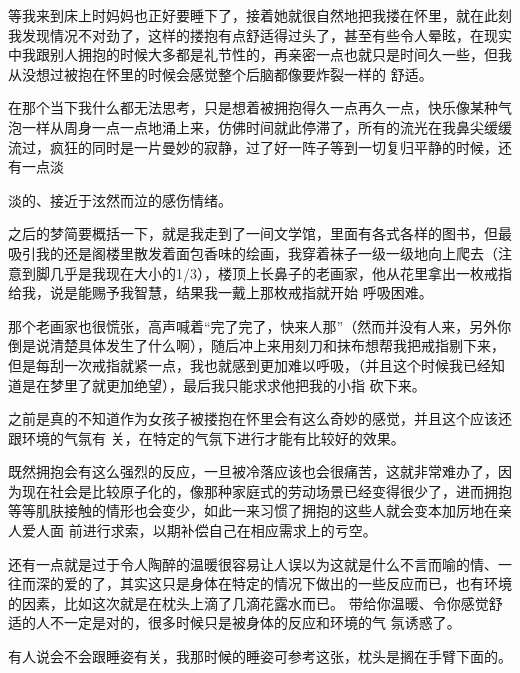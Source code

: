 \documentclass{article}
\begin{document}
等我来到床上时妈妈也正好要睡下了，接着她就很自然地把我搂在怀里，就在此刻我发现情况不对劲了，这样的搂抱有点舒适得过头了，甚至有些令人晕眩，在现实中我跟别人拥抱的时候大多都是礼节性的，再亲密一点也就只是时间久一些，但我从没想过被抱在怀里的时候会感觉整个后脑都像要炸裂一样的
舒适。 

在那个当下我什么都无法思考，只是想着被拥抱得久一点再久一点，快乐像某种气泡一样从周身一点一点地涌上来，仿佛时间就此停滞了，所有的流光在我鼻尖缓缓流过，疯狂的同时是一片曼妙的寂静，过了好一阵子等到一切复归平静的时候，还有一点淡

\newpage
淡的、接近于泫然而泣的感伤情绪。 

之后的梦简要概括一下，就是我走到了一间文学馆，里面有各式各样的图书，但最吸引我的还是阁楼里散发着面包香味的绘画，我穿着袜子一级一级地向上爬去（注意到脚几乎是我现在大小的1/3），楼顶上长鼻子的老画家，他从花里拿出一枚戒指给我，说是能赐予我智慧，结果我一戴上那枚戒指就开始
呼吸困难。 

那个老画家也很慌张，高声喊着“完了完了，快来人那”（然而并没有人来，另外你倒是说清楚具体发生了什么啊），随后冲上来用刻刀和抹布想帮我把戒指剔下来，但是每刮一次戒指就紧一点，我也就感到更加难以呼吸，（并且这个时候我已经知道是在梦里了就更加绝望），最后我只能求求他把我的小指
砍下来。 

之前是真的不知道作为女孩子被搂抱在怀里会有这么奇妙的感觉，并且这个应该还跟环境的气氛有
关，在特定的气氛下进行才能有比较好的效果。 

\newpage

既然拥抱会有这么强烈的反应，一旦被冷落应该也会很痛苦，这就非常难办了，因为现在社会是比较原子化的，像那种家庭式的劳动场景已经变得很少了，进而拥抱等等肌肤接触的情形也会变少，如此一来习惯了拥抱的这些人就会变本加厉地在亲人爱人面
前进行求索，以期补偿自己在相应需求上的亏空。 

还有一点就是过于令人陶醉的温暖很容易让人误以为这就是什么不言而喻的情、一往而深的爱的了，其实这只是身体在特定的情况下做出的一些反应而已，也有环境的因素，比如这次就是在枕头上滴了几滴花露水而已。 带给你温暖、令你感觉舒适的人不一定是对的，很多时候只是被身体的反应和环境的气
氛诱惑了。 

有人说会不会跟睡姿有关，我那时候的睡姿可参考这张，枕头是搁在手臂下面的。
\end{document}
